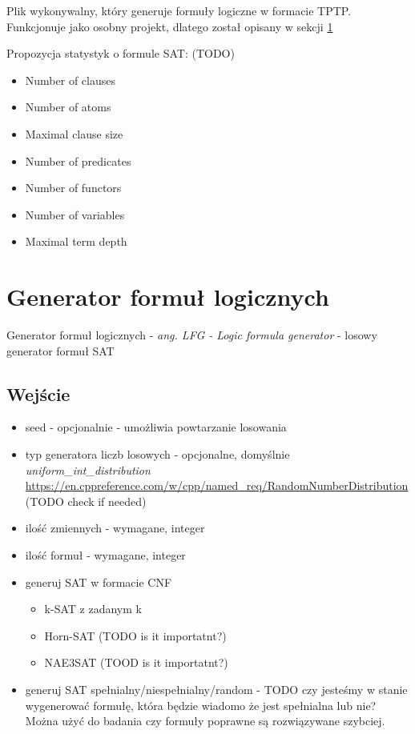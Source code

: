 \documentclass[a4paper,12pt]{article}
\begin{document}
Plik wykonywalny, który generuje formuły logiczne w formacie TPTP. Funkcjonuje jako osobny projekt, dlatego został opisany w sekcji \ref{LFG}

Propozycja statystyk o formule SAT: (TODO)

\begin{itemize}
  \item Number of clauses
  \item Number of atoms
  \item Maximal clause size
  \item Number of predicates
  \item Number of functors
  \item Number of variables
  \item Maximal term depth
\end{itemize}

\section{Generator formuł logicznych}\label{LFG}

Generator formuł logicznych - \textit{ang. LFG - Logic formula generator} - losowy generator formuł SAT

\subsection{Wejście}

\begin{itemize}
  \item seed - opcjonalnie - umożliwia powtarzanie losowania
  \item typ generatora liczb losowych - opcjonalne, domyślnie \textit{uniform\_int\_distribution} \url{https://en.cppreference.com/w/cpp/named_req/RandomNumberDistribution} (TODO check if needed)
  \item ilość zmiennych - wymagane, integer
  \item ilość formuł - wymagane, integer
  \item generuj \gls{SAT} w formacie \gls{CNF}
    \begin{itemize}
      \item k-SAT z zadanym k
      \item Horn-SAT (TODO is it importatnt?)
      \item NAE3SAT (TOOD is it importatnt?)
    \end{itemize}
  \item generuj \gls{SAT} spełnialny/niespełnialny/random - TODO czy jesteśmy w stanie wygenerować formułę, która będzie wiadomo że jest spełnialna lub nie? Można użyć do badania czy formuły poprawne są rozwiązywane szybciej.
\end{itemize}
\end{document}
